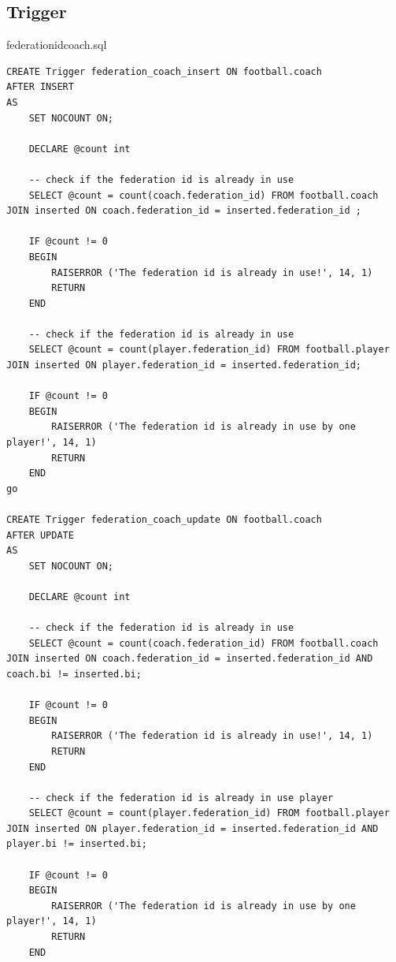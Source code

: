 \documentclass[pdftex,12pt,a4paper]{report}
\begin{document}
\newpage
\subsection*{Trigger}
federation{\textunderscore}id{\textunderscore}coach.sql
\begin{lstlisting} 
CREATE Trigger federation_coach_insert ON football.coach
AFTER INSERT
AS
	SET NOCOUNT ON;

	DECLARE @count int

	-- check if the federation id is already in use
	SELECT @count = count(coach.federation_id) FROM football.coach JOIN inserted ON coach.federation_id = inserted.federation_id ;

	IF @count != 0
	BEGIN
		RAISERROR ('The federation id is already in use!', 14, 1)
		RETURN
	END

	-- check if the federation id is already in use
	SELECT @count = count(player.federation_id) FROM football.player JOIN inserted ON player.federation_id = inserted.federation_id;

	IF @count != 0
	BEGIN
		RAISERROR ('The federation id is already in use by one player!', 14, 1)
		RETURN
	END
go

CREATE Trigger federation_coach_update ON football.coach
AFTER UPDATE
AS
	SET NOCOUNT ON;

	DECLARE @count int

	-- check if the federation id is already in use
	SELECT @count = count(coach.federation_id) FROM football.coach JOIN inserted ON coach.federation_id = inserted.federation_id AND coach.bi != inserted.bi;

	IF @count != 0
	BEGIN
		RAISERROR ('The federation id is already in use!', 14, 1)
		RETURN
	END

	-- check if the federation id is already in use player
	SELECT @count = count(player.federation_id) FROM football.player JOIN inserted ON player.federation_id = inserted.federation_id AND player.bi != inserted.bi;

	IF @count != 0
	BEGIN
		RAISERROR ('The federation id is already in use by one player!', 14, 1)
		RETURN
	END
\end{lstlisting}
\end{document}
